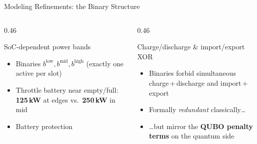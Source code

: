 \documentclass[aspectratio=169]{beamer}
\begin{document}
\begin{frame}{Modeling Refinements: the Binary Structure}
\begin{columns}[t]
\begin{column}{0.46\textwidth}
\begin{block}{SoC-dependent power bands}
    \begin{itemize}\footnotesize
        \item Binaries $b^{\text{low}}, b^{\text{mid}}, b^{\text{high}}$
              (exactly one active per slot)
        \item Throttle battery near empty/full:
              \textbf{125\,kW} at edges vs.\ \textbf{250\,kW} in mid
        \item Battery protection
    \end{itemize}
\end{block}
\end{column}
\hspace{0.04\textwidth}
\begin{column}{0.46\textwidth}
\begin{block}{Charge/discharge \& import/export XOR}
    \begin{itemize}\footnotesize
        \item Binaries forbid simultaneous charge\,+\,discharge and
              import\,+\,export
        \item Formally \emph{redundant} classically\dots
        \item \dots but mirror the \textbf{QUBO penalty terms} on the
              quantum side
    \end{itemize}
\end{block}
\end{column}
\end{columns}
\end{frame}
\end{document}
